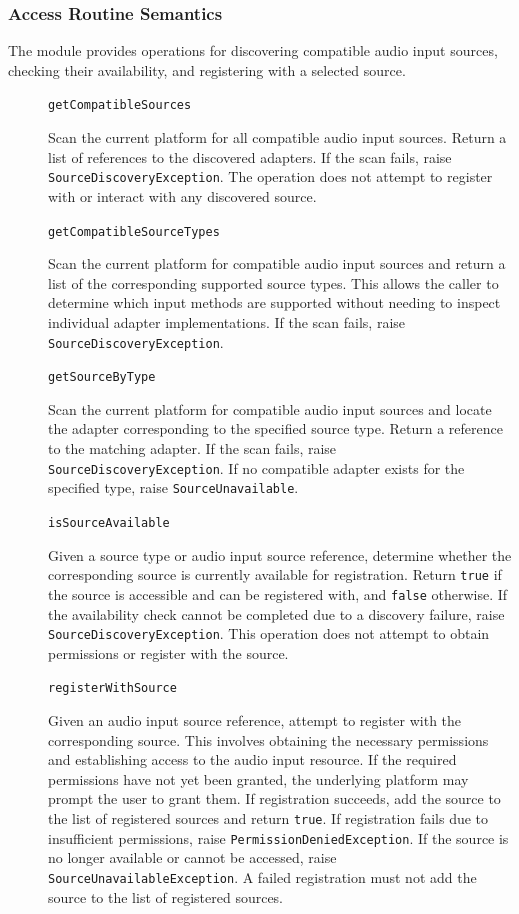 \documentclass[12pt, titlepage]{article}
\begin{document}
\subsubsection{Access Routine Semantics}

The module provides operations for discovering compatible audio input sources, checking their availability, and registering with a selected source.

\begin{description}

\item[] \texttt{getCompatibleSources}\par
Scan the current platform for all compatible audio input sources. Return a list of references to the discovered adapters. If the scan fails, raise \texttt{SourceDiscoveryException}. The operation does not attempt to register with or interact with any discovered source.

\item[] \texttt{getCompatibleSourceTypes}\par
Scan the current platform for compatible audio input sources and return a list of the corresponding supported source types. This allows the caller to determine which input methods are supported without needing to inspect individual adapter implementations. If the scan fails, raise \texttt{SourceDiscoveryException}.

\item[] \texttt{getSourceByType}\par
Scan the current platform for compatible audio input sources and locate the adapter corresponding to the specified source type. Return a reference to the matching adapter. If the scan fails, raise \texttt{SourceDiscoveryException}. If no compatible adapter exists for the specified type, raise \texttt{SourceUnavailable}.

\item[] \texttt{isSourceAvailable}\par
Given a source type or audio input source reference, determine whether the corresponding source is currently available for registration. Return \texttt{true} if the source is accessible and can be registered with, and \texttt{false} otherwise. If the availability check cannot be completed due to a discovery failure, raise \texttt{SourceDiscoveryException}. This operation does not attempt to obtain permissions or register with the source.

\item[] \texttt{registerWithSource}\par
Given an audio input source reference, attempt to register with the corresponding source. This involves obtaining the necessary permissions and establishing access to the audio input resource. If the required permissions have not yet been granted, the underlying platform may prompt the user to grant them. If registration succeeds, add the source to the list of registered sources and return \texttt{true}. If registration fails due to insufficient permissions, raise \texttt{PermissionDeniedException}. If the source is no longer available or cannot be accessed, raise \texttt{SourceUnavailableException}. A failed registration must not add the source to the list of registered sources.


\end{description}
\end{document}
